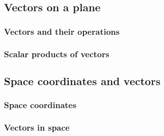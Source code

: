 \subsection{Vectors on a plane}
\subsubsection{Vectors and their operations}
\subsubsection{Scalar products of vectors}

\subsection{Space coordinates and vectors}
\subsubsection{Space coordinates}
\subsubsection{Vectors in space}
